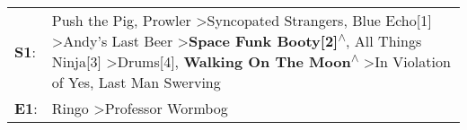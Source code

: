 \begin{supertabular}{p{0.03\textwidth}p{0.92\textwidth}}
 \textbf{S1}:  &  Push the Pig\textsuperscript{}, \enspace Prowler\textsuperscript{} \textgreater \enspace Syncopated Strangers\textsuperscript{}, \enspace Blue Echo[1]\textsuperscript{} \textgreater \enspace Andy's Last Beer\textsuperscript{} \textgreater \enspace \textbf{Space Funk Booty[2]\textsuperscript{$\wedge$}}, \enspace All Things Ninja[3]\textsuperscript{} \textgreater \enspace Drums[4]\textsuperscript{}, \enspace \textbf{Walking On The Moon\textsuperscript{$\wedge$}} \textgreater \enspace In Violation of Yes\textsuperscript{}, \enspace Last Man Swerving\textsuperscript{}  \enspace  \\
 \textbf{E1}:  &                                                                                                                                                                                                                                                                                                                                                                                                                                                                                                           Ringo\textsuperscript{} \textgreater \enspace Professor Wormbog\textsuperscript{}  \enspace  \\
\end{supertabular}
